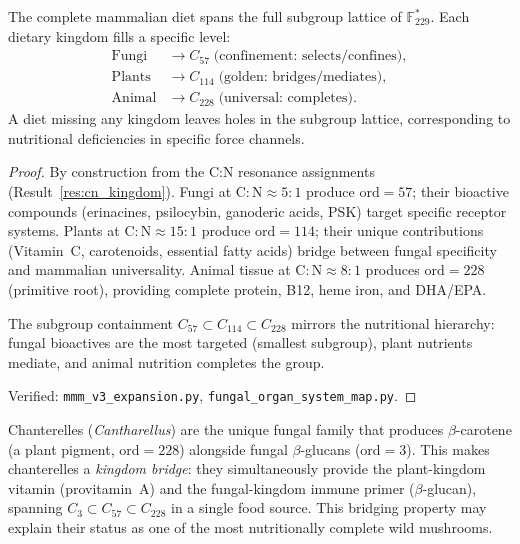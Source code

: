 \begin{theorem}
\label{thm:nutrition}
The complete mammalian diet spans the full subgroup lattice of
$\mathbb{F}_{229}^*$. Each dietary kingdom fills a specific level:
\begin{align}
  \text{Fungi} &\to C_{57} \;\text{(confinement: selects/confines)}, \\
  \text{Plants} &\to C_{114} \;\text{(golden: bridges/mediates)}, \\
  \text{Animal} &\to C_{228} \;\text{(universal: completes)}.
\end{align}
A diet missing any kingdom leaves holes in the subgroup lattice,
corresponding to nutritional deficiencies in specific force channels.

\begin{proof}
By construction from the C:N resonance assignments (Result~\ref{res:cn_kingdom}).
Fungi at $\mathrm{C:N} \approx 5{:}1$ produce $\mathrm{ord} = 57$; their
bioactive compounds (erinacines, psilocybin, ganoderic acids, PSK) target
specific receptor systems. Plants at $\mathrm{C:N} \approx 15{:}1$ produce
$\mathrm{ord} = 114$; their unique contributions (Vitamin~C, carotenoids,
essential fatty acids) bridge between fungal specificity and mammalian
universality. Animal tissue at $\mathrm{C:N} \approx 8{:}1$ produces
$\mathrm{ord} = 228$ (primitive root), providing complete protein, B12,
heme iron, and DHA/EPA.

The subgroup containment $C_{57} \subset C_{114} \subset C_{228}$
mirrors the nutritional hierarchy: fungal bioactives are the most targeted
(smallest subgroup), plant nutrients mediate, and animal nutrition completes
the group.

Verified: \texttt{mmm\_v3\_expansion.py}, \texttt{fungal\_organ\_system\_map.py}.
\qedhere
\end{proof}
\end{theorem}

\begin{remark}
Chanterelles (\emph{Cantharellus}) are the unique fungal family that produces
$\beta$-carotene (a plant pigment, $\mathrm{ord} = 228$) alongside
fungal $\beta$-glucans ($\mathrm{ord} = 3$). This makes chanterelles a
\emph{kingdom bridge}: they simultaneously provide the plant-kingdom vitamin
(provitamin~A) and the fungal-kingdom immune primer ($\beta$-glucan),
spanning $C_3 \subset C_{57} \subset C_{228}$ in a single food source.
This bridging property may explain their status as one of the most
nutritionally complete wild mushrooms.
\end{remark}

